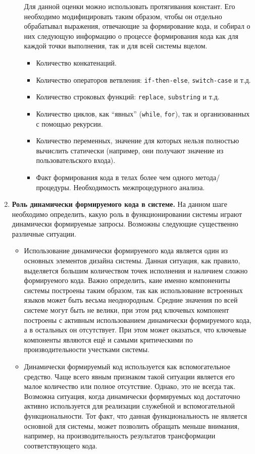 \begin{enumerate}
\begin{itemize}
    Для данной оценки можно использовать протягивания констант. Его необходимо модифицировать таким образом, чтобы он отдельно обрабатывал выражения, отвечающие за формирование кода, и собирал о них следующую информацию о процессе формирования кода как для каждой точки выполнения, так и для всей системы вцелом.
    \begin{itemize}
      \item Количество конкатенаций.
      \item Количество операторов ветвления: \verb|if-then-else|, \verb|switсh-case| и т.д.
      \item Количество строковых функций: \verb|replace|, \verb|substring| и т.д.
      \item Количество циклов, как ``явных'' (\verb|while|, \verb|for|), так и организованных с помощью рекурсии.
      \item Количество переменных, значение для которых нельзя полностью вычислить статически (например, они получают значение из пользовательского входа).
      \item Факт формирования кода в телах более чем одного метода/процедуры. Необходимость межпроцедурного анализа.
    \end{itemize}
  \end{itemize}
  
  \item \textbf{Роль динамически формируемого кода в системе.} На данном шаге необходимо определить, какую роль в функционировании системы играют динамически формируемые запросы. Возможны следующие существенно различные ситуации.
  \begin{itemize}
    \item Использование динамически формируемого кода является один из основных элементов дизайна системы. Данная ситуация, как правило, выделяется большим количеством точек исполнения и наличием сложно формируемого кода. Важно определить, каие именно компонениты системы построены таким образом, так как использование встроенных языков может быть весьма неоднородным. Средние значения по всей системе могут быть не велики, при этом ряд ключевых компонент построены с активным использованием динамически формируемого кода, а в остальных он отсутствует. При этом может оказаться, что ключевые компоненты являются ещё и самыми критическими по производительности учестками системы.
    
    \item Динамически формируемый код используется как вспомогательное средство. Чаще всего явным признаком такой ситуации является его малое количество или полное отсутствие. Однако, это не всегда так. Возможна ситуация, когда динамически формируемых код достаточно активно используется для реализации служебной и вспомогательной функциональности. Тот факт, что данная функциональность не является основной для системы, может позволить обращать меньше внимания, например, на производительность результатов трансформации соответствующего кода.
  \end{itemize}
  

\end{enumerate}
